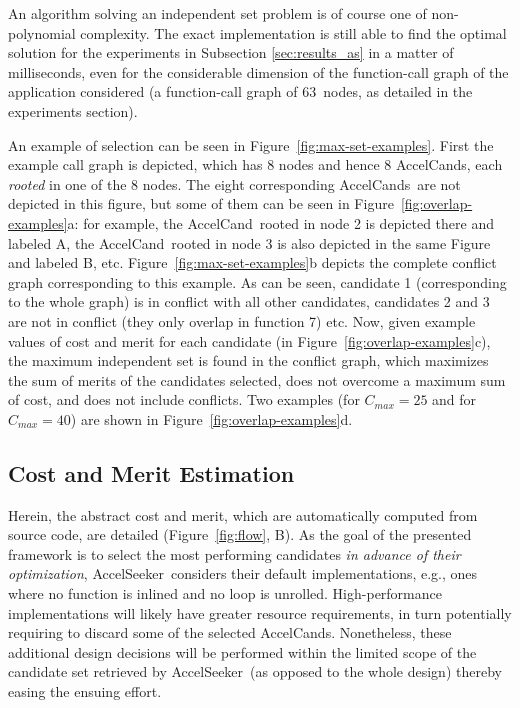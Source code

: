 \documentclass[]{usiinfthesis}
\newcommand{\aseeker}{{AccelSeeker}}
\newcommand{\candidate}{{AccelCand}}
\newcommand{\candidates}{{AccelCand}s}
\newcommand{\numberOfcandidates}{{63}}
\begin{document}
An algorithm solving an independent set problem is of course one of
non-polynomial complexity. The exact implementation is still able to
find the optimal solution for the experiments in Subsection \ref{sec:results_as} in a
matter of milliseconds, even for the considerable dimension of the
function-call graph of the application considered (a function-call
graph of \numberOfcandidates\ nodes, as detailed in the experiments 
section).\par

An example of selection can be seen in
Figure~\ref{fig:max-set-examples}. First the example call graph is
depicted, which has 8 nodes and hence 8 \candidates, each
\emph{rooted} in one of the 8 nodes. The eight corresponding
\candidates\ are not depicted in this figure, but some of them can be
seen in Figure~\ref{fig:overlap-examples}a: for example, the
\candidate\ rooted in node 2 is depicted there and labeled A, the
\candidate\ rooted in node 3 is also depicted in the same Figure and
labeled B, etc.  Figure~\ref{fig:max-set-examples}b depicts the
complete conflict graph corresponding to this example. As can be seen,
candidate 1 (corresponding to the whole graph) is in conflict with all
other candidates, candidates 2 and 3 are not in conflict (they only
overlap in function 7) etc. Now, given example values of cost and
merit for each candidate (in Figure~\ref{fig:overlap-examples}c), the
maximum independent set is found in the conflict graph, which
maximizes the sum of merits of the candidates selected, does not
overcome a maximum sum of cost, and does not include conflicts. Two
examples (for $C_{max} = 25$ and for $C_{max} = 40$) are shown in
Figure~\ref{fig:overlap-examples}d.




\subsection{Cost and Merit Estimation}
\label{sec:estimation}

Herein, the abstract cost and merit, which are automatically computed from 
source code, are detailed (Figure~\ref{fig:flow}, B). As the goal of the 
presented framework is to select the most performing candidates \emph{in 
advance of their optimization}, \aseeker\ considers their default implementations,
e.g., ones where no function is inlined and no loop is unrolled.
High-performance implementations will likely have greater resource
requirements, in turn potentially requiring to discard some of the
selected \candidates. Nonetheless, these additional design decisions will
be performed within the limited scope of the candidate set retrieved
by \aseeker\ (as opposed to the whole design) thereby easing the
ensuing effort.\par
\end{document}
